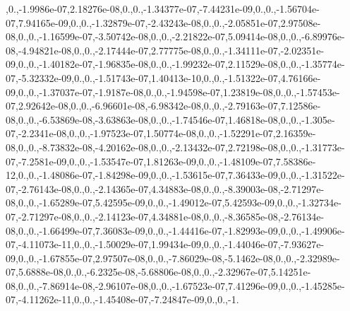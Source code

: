 {,0.,-\/1.\-9986e-\/07,2.\-18276e-\/08,0.,0.,-\/1.\-34377e-\/07,-\/7.\-44231e-\/09,0.,0.,-\/1.\-56704e-\/07,7.\-94165e-\/09,0.,0.,-\/1.\-32879e-\/07,-\/2.\-43243e-\/08,0.,0.,-\/2.\-05851e-\/07,2.\-97508e-\/08,0.,0.,-\/1.\-16599e-\/07,-\/3.\-50742e-\/08,0.,0.,-\/2.\-21822e-\/07,5.\-09414e-\/08,0.,0.,-\/6.\-89976e-\/08,-\/4.\-94821e-\/08,0.,0.,-\/2.\-17444e-\/07,2.\-77775e-\/08,0.,0.,-\/1.\-34111e-\/07,-\/2.\-02351e-\/09,0.,0.,-\/1.\-40182e-\/07,-\/1.\-96835e-\/08,0.,0.,-\/1.\-99232e-\/07,2.\-11529e-\/08,0.,0.,-\/1.\-35774e-\/07,-\/5.\-32332e-\/09,0.,0.,-\/1.\-51743e-\/07,1.\-40413e-\/10,0.,0.,-\/1.\-51322e-\/07,4.\-76166e-\/09,0.,0.,-\/1.\-37037e-\/07,-\/1.\-9187e-\/08,0.,0.,-\/1.\-94598e-\/07,1.\-23819e-\/08,0.,0.,-\/1.\-57453e-\/07,2.\-92642e-\/08,0.,0.,-\/6.\-96601e-\/08,-\/6.\-98342e-\/08,0.,0.,-\/2.\-79163e-\/07,7.\-12586e-\/08,0.,0.,-\/6.\-53869e-\/08,-\/3.\-63863e-\/08,0.,0.,-\/1.\-74546e-\/07,1.\-46818e-\/08,0.,0.,-\/1.\-305e-\/07,-\/2.\-2341e-\/08,0.,0.,-\/1.\-97523e-\/07,1.\-50774e-\/08,0.,0.,-\/1.\-52291e-\/07,2.\-16359e-\/08,0.,0.,-\/8.\-73832e-\/08,-\/4.\-20162e-\/08,0.,0.,-\/2.\-13432e-\/07,2.\-72198e-\/08,0.,0.,-\/1.\-31773e-\/07,-\/7.\-2581e-\/09,0.,0.,-\/1.\-53547e-\/07,1.\-81263e-\/09,0.,0.,-\/1.\-48109e-\/07,7.\-58386e-\/12,0.,0.,-\/1.\-48086e-\/07,-\/1.\-84298e-\/09,0.,0.,-\/1.\-53615e-\/07,7.\-36433e-\/09,0.,0.,-\/1.\-31522e-\/07,-\/2.\-76143e-\/08,0.,0.,-\/2.\-14365e-\/07,4.\-34883e-\/08,0.,0.,-\/8.\-39003e-\/08,-\/2.\-71297e-\/08,0.,0.,-\/1.\-65289e-\/07,5.\-42595e-\/09,0.,0.,-\/1.\-49012e-\/07,5.\-42593e-\/09,0.,0.,-\/1.\-32734e-\/07,-\/2.\-71297e-\/08,0.,0.,-\/2.\-14123e-\/07,4.\-34881e-\/08,0.,0.,-\/8.\-36585e-\/08,-\/2.\-76134e-\/08,0.,0.,-\/1.\-66499e-\/07,7.\-36083e-\/09,0.,0.,-\/1.\-44416e-\/07,-\/1.\-82993e-\/09,0.,0.,-\/1.\-49906e-\/07,-\/4.\-11073e-\/11,0.,0.,-\/1.\-50029e-\/07,1.\-99434e-\/09,0.,0.,-\/1.\-44046e-\/07,-\/7.\-93627e-\/09,0.,0.,-\/1.\-67855e-\/07,2.\-97507e-\/08,0.,0.,-\/7.\-86029e-\/08,-\/5.\-1462e-\/08,0.,0.,-\/2.\-32989e-\/07,5.\-6888e-\/08,0.,0.,-\/6.\-2325e-\/08,-\/5.\-68806e-\/08,0.,0.,-\/2.\-32967e-\/07,5.\-14251e-\/08,0.,0.,-\/7.\-86914e-\/08,-\/2.\-96107e-\/08,0.,0.,-\/1.\-67523e-\/07,7.\-41296e-\/09,0.,0.,-\/1.\-45285e-\/07,-\/4.\-11262e-\/11,0.,0.,-\/1.\-45408e-\/07,-\/7.\-24847e-\/09,0.,0.,-\/1.}
